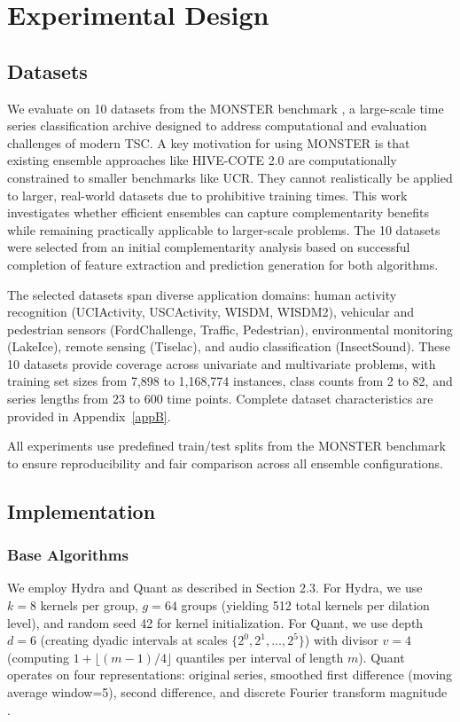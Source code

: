\documentclass[pdflatex,sn-basic]{sn-jnl}           %
\theoremstyle{thmstyleone}%
\theoremstyle{thmstyletwo}%
\theoremstyle{thmstylethree}%
\begin{document}
\section{Experimental Design}\label{sec4}

\subsection{Datasets}

We evaluate on 10 datasets from the MONSTER benchmark \citep{monster}, a large-scale time series classification archive designed to address computational and evaluation challenges of modern TSC. A key motivation for using MONSTER is that existing ensemble approaches like HIVE-COTE 2.0 are computationally constrained to smaller benchmarks like UCR. They cannot realistically be applied to larger, real-world datasets due to prohibitive training times. This work investigates whether efficient ensembles can capture complementarity benefits while remaining practically applicable to larger-scale problems. The 10 datasets were selected from an initial complementarity analysis based on successful completion of feature extraction and prediction generation for both algorithms.

The selected datasets span diverse application domains: human activity recognition (UCIActivity, USCActivity, WISDM, WISDM2), vehicular and pedestrian sensors (FordChallenge, Traffic, Pedestrian), environmental monitoring (LakeIce), remote sensing (Tiselac), and audio classification (InsectSound). These 10 datasets provide coverage across univariate and multivariate problems, with training set sizes from 7,898 to 1,168,774 instances, class counts from 2 to 82, and series lengths from 23 to 600 time points. Complete dataset characteristics are provided in Appendix~\ref{appB}.

All experiments use predefined train/test splits from the MONSTER benchmark to ensure reproducibility and fair comparison across all ensemble configurations.

\subsection{Implementation}\label{subsec:implementation}

\subsubsection{Base Algorithms} 

We employ Hydra and Quant as described in Section 2.3. For Hydra, we use $k=8$ kernels per group, $g=64$ groups (yielding 512 total kernels per dilation level), and random seed 42 for kernel initialization. For Quant, we use depth $d=6$ (creating dyadic intervals at scales $\{2^0, 2^1, ..., 2^5\}$) with divisor $v=4$ (computing $1 + \lfloor (m-1)/4 \rfloor$ quantiles per interval of length $m$). Quant operates on four representations: original series, smoothed first difference (moving average window=5), second difference, and discrete Fourier transform magnitude \citep{quant}.
\end{document}
